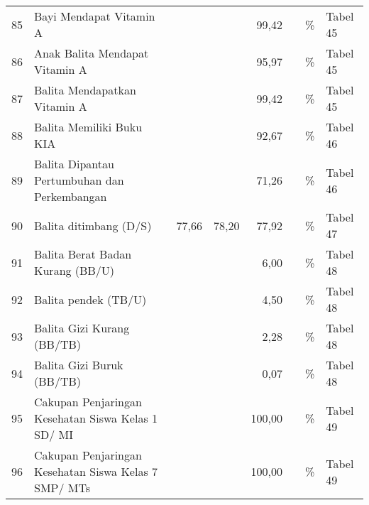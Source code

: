 \begin{small}
\begin{longtable}{rY{12em}rrrrY{5em}Y{5em}}
	 85 & Bayi Mendapat Vitamin A                                                     &        &        &              99,42 &          & \%                             & Tabel 45 \\
	 86 & Anak Balita Mendapat Vitamin A                                              &        &        &              95,97 &          & \%                             & Tabel 45 \\
	 87 & Balita Mendapatkan Vitamin A                                                &        &        &              99,42 &          & \%                             & Tabel 45 \\
	 88 & Balita Memiliki Buku KIA                                                    &        &        &              92,67 &          & \%                             & Tabel 46 \\
	 89 & Balita Dipantau Pertumbuhan dan Perkembangan                                &        &        &              71,26 &          & \%                             & Tabel 46 \\
	 90 & Balita ditimbang (D/S)                                                      &  77,66 &  78,20 &              77,92 &          & \%                             & Tabel 47 \\
	 91 & Balita Berat Badan Kurang (BB/U)                                            &        &        &               6,00 &          & \%                             & Tabel 48 \\
	 92 & Balita pendek (TB/U)                                                        &        &        &               4,50 &          & \%                             & Tabel 48 \\
	 93 & Balita Gizi Kurang (BB/TB)                                                  &        &        &               2,28 &          & \%                             & Tabel 48 \\
	 94 & Balita Gizi Buruk (BB/TB)                                                   &        &        &               0,07 &          & \%                             & Tabel 48 \\
	 95 & Cakupan Penjaringan Kesehatan Siswa Kelas 1 SD/ MI                          &        &        &             100,00 &          & \%                             & Tabel 49 \\
	 96 & Cakupan Penjaringan Kesehatan Siswa Kelas 7 SMP/ MTs                        &        &        &             100,00 &          & \%                             & Tabel 49 \\

\end{longtable}
\end{small}
